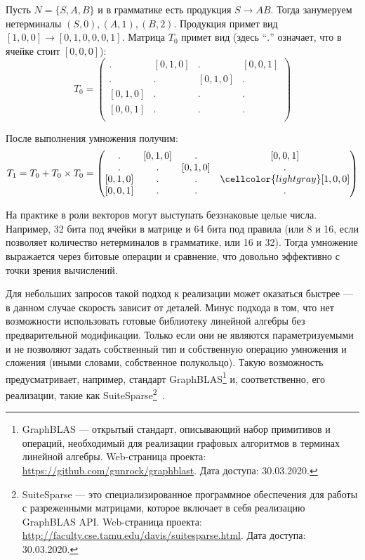 \begin{example}
Пусть $N = \{S, A, B\}$ и в грамматике есть продукция $S \to A B$. Тогда занумеруем нетерминалы $ (S, 0), (A, 1), (B, 2)$. Продукция примет вид $[1, 0, 0] \to [0, 1, 0, 0, 0, 1]$. Матрица $T_0$ примет вид (здесь ``$.$'' означает, что в ячейке стоит $[0,0,0]$):
\[
T_0 = \begin{pmatrix}
. & [0,1,0]       & . & [0,0,1]       \\
. & . & [0,1,0]       & . \\
[0,1,0]       & . & . & . \\
[0,0,1]      & . & . & . \\
\end{pmatrix}
\]

После выполнения умножения получим:
\[
T_1 = T_0 + T_0 \times T_0 =
\begin{pmatrix}
. & [0,1,0]       & . & [0,0,1]       \\
. & . & [0,1,0]       & . \\
[0,1,0]       & . & . & \cellcolor{lightgray}[1,0,0] \\
[0,0,1]      & . & . & . \\
\end{pmatrix}
\]
\end{example}


На практике в роли векторов могут выступать беззнаковые целые числа.
Например, 32 бита под ячейки в матрице и 64 бита под правила (или 8 и 16, если позволяет количество нетерминалов в грамматике, или 16 и 32).
Тогда умножение выражается через битовые операции и сравнение, что довольно эффективно с точки зрения вычислений.

Для небольших запросов такой подход к реализации может оказаться быстрее --- в данном случае скорость зависит от деталей. Минус подхода в том, что нет возможности использовать готовые библиотеку линейной алгебры без предварительной модификации. Только если они не являются параметризуемыми и не позволяют задать собственный тип и собственную операцию умножения и сложения (иными словами, собственное полукольцо). Такую возможность предусматривает, например, стандарт GraphBLAS\footnote{GraphBLAS --- открытый стандарт, описывающий набор примитивов и операций, необходимый для реализации графовых алгоритмов в терминах линейной алгебры. Web-страница проекта: \url{https://github.com/gunrock/graphblast}. Дата доступа: 30.03.2020.} и, соответственно, его реализации, такие как SuiteSparse\footnote{SuiteSparse --- это специализированное программное обеспечения для работы с разреженными матрицами, которое включает в себя реализацию GraphBLAS API. Web-страница проекта: \url{http://faculty.cse.tamu.edu/davis/suitesparse.html}. Дата доступа: 30.03.2020.}~\cite{Davis2018Algorithm9S}.

